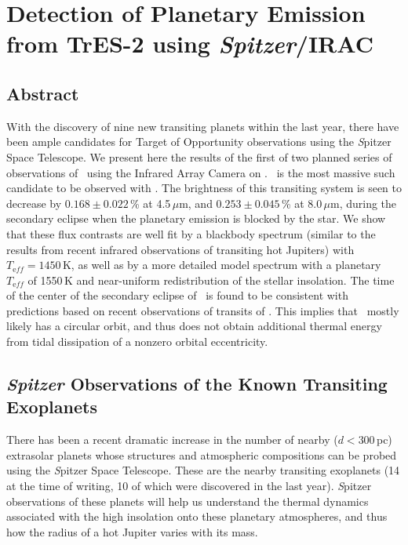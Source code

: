 \chapter[Detection of Planetary Emission from TrES-2 using \emph{Spitzer}/ IRAC]
{%
Detection of Planetary Emission from TrES-2 using \emph{Spitzer}/IRAC%
\protect\CFNE%
}\label{cha:spitzer}

\section*{Abstract}\label{cha:spitzer:sec:abs}

With the discovery of nine new transiting planets within the last year, there have been ample candidates for Target of Opportunity observations using the {\textit Spitzer Space Telescope}.
We present here the results of the first of two planned series of observations of \tresTwo\ using the Infrared Array Camera on \spi.
\tresTwo\ is the most massive such candidate to be observed with \spi.
The brightness of this transiting system is seen to decrease by \mbox{$0.168 \pm 0.022$\,\%} at 4.5\,$\mu$m, and \mbox{$0.253 \pm 0.045$\,\%} at 8.0\,$\mu$m, during the secondary eclipse when the planetary emission is blocked by the star.
We show that these flux contrasts are well fit by a blackbody spectrum (similar to the results from recent infrared observations of transiting hot Jupiters) with \mbox{$T_{\mathrm eff}=1450$\,K}, as well as by a more detailed model spectrum with a planetary $T_{\mathrm eff}$ of 1550\,K and near-uniform redistribution of the stellar insolation.
The time of the center of the secondary eclipse of \tresTwo\ is found to be consistent with predictions based on recent observations of transits of \tresTwo.
This implies that \tresTwo\ mostly likely has a circular orbit, and thus does not obtain additional thermal energy from tidal dissipation of a nonzero orbital eccentricity.

\section[\textit{Spitzer} Observations of the Known Transiting Exoplanets]{\textbf{\textit{Spitzer}} Observations of the Known Transiting Exoplanets}\label{cha:spitzer:sec:intro}

There has been a recent dramatic increase in the number of nearby ($d<300$\,pc) extrasolar planets whose structures and atmospheric compositions can be probed using the {\textit Spitzer Space Telescope}.
These are the nearby transiting exoplanets (14 at the time of writing, 10 of which were discovered in the last year).
{\textit Spitzer} observations of these planets will help us understand the thermal dynamics associated with the high insolation onto these planetary atmospheres, and thus how the radius of a hot Jupiter varies with its mass.

